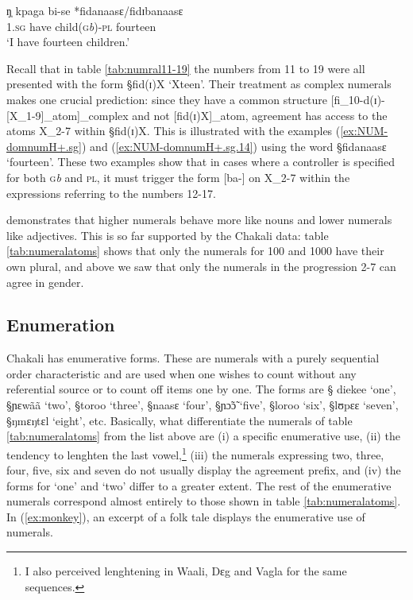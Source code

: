\begin{exe}
\begin{xlist}
\ex\label{ex:NUM-domnumH+.sg.14}
\gll    ŋ̩  kpaga  bi-se *fidanaasɛ/fidɪbanaasɛ \\
       \textsc{1.sg}  {have}  {child(\textsc{g}\textit{b})-\textsc{pl}}  
{fourteen} \\
\glt `I have fourteen children.' \\

\end{xlist}
\end{exe}


Recall that in table \ref{tab:numral11-19} the numbers from 11 to 19 were all
presented with the form
{\S  fid(ɪ)X}    `Xteen'. Their treatment as complex numerals makes one crucial
prediction: since they   have a common structure
[fi_{10}-d(ɪ)-[X_{1-9}]_{atom}]_{complex} and not [fid(ɪ)X]_{atom},
 agreement   has
access to the atoms X_{2-7} within {\S fid(ɪ)X}. This is
illustrated with the examples (\ref{ex:NUM-domnumH+.sg}) and
(\ref{ex:NUM-domnumH+.sg.14}) using the word {\S fidanaasɛ}
`fourteen'.
These two examples show that in cases where a controller is specified for
both \textsc{g}{\it b} and \textsc{pl}, it must trigger the form
[ba-] on X_{2-7}   within the expressions referring to the numbers 12-17.

\citet[64]{Corb78} demonstrates
that higher numerals  behave more like nouns and lower numerals like
adjectives.  This is so far supported by the Chakali data: table
\ref{tab:numeralatoms} shows that only the numerals for 100 and 1000 have their
own plural, and above we saw that only the numerals in the progression 2-7 can
agree in gender.




\subsection{Enumeration}
\label{sec:NUM-enum}

Chakali has enumerative forms. These  are numerals
with a purely sequential order characteristic and are used when one wishes
to count without 
any referential source or  to count off items one by one.  The forms are {\S
diekee} `one',
{\S ɲɛwãã} `two', {\S toroo} `three', {\S naasɛ} `four',  {\S ɲɔ̃ɔ̃} `five',
{\S loroo} `six', {\S lʊpɛɛ} `seven', {\S ŋmɛŋtɛl} `eight', etc. Basically, 
what
differentiate the numerals of table \ref{tab:numeralatoms} from the list above
are (i) a specific enumerative use, (ii) the tendency to lenghten the last
vowel,\footnote{I also perceived lenghtening  in Waali, Dɛg and
Vagla for the
same
sequences.} (iii)  the numerals  expressing two, three, four, five,
six and seven do not usually display the agreement prefix,  and
(iv) the forms for `one'
and `two' differ to a greater extent. The rest of the enumerative numerals
correspond almost entirely to those shown in table
\ref{tab:numeralatoms}.  In (\ref{ex:monkey}), an excerpt of a folk tale
displays the
enumerative use of numerals.

